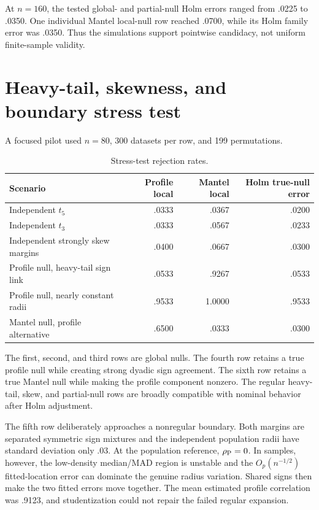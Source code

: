 At $n=160$, the tested global- and partial-null Holm errors ranged from
.0225 to .0350. One individual Mantel local-null row reached .0700, while its
Holm family error was .0350. Thus the simulations support pointwise candidacy,
not uniform finite-sample validity.

\section{Heavy-tail, skewness, and boundary stress test}

A focused pilot used $n=80$, 300 datasets per row, and 199 permutations.

\begin{table}[ht]
\centering
\caption{Stress-test rejection rates.}
\small
\begin{tabular}{lrrr}
\hline
Scenario & Profile local & Mantel local & Holm true-null error\\
\hline
Independent $t_5$ & .0333 & .0367 & .0200\\
Independent $t_3$ & .0333 & .0567 & .0233\\
Independent strongly skew margins & .0400 & .0667 & .0300\\
Profile null, heavy-tail sign link & .0533 & .9267 & .0533\\
Profile null, nearly constant radii & .9533 & 1.0000 & .9533\\
Mantel null, profile alternative & .6500 & .0333 & .0300\\
\hline
\end{tabular}
\end{table}

The first, second, and third rows are global nulls. The fourth row retains a
true profile null while creating strong dyadic sign agreement. The sixth row
retains a true Mantel null while making the profile component nonzero. The
regular heavy-tail, skew, and partial-null rows are broadly compatible with
nominal behavior after Holm adjustment.

The fifth row deliberately approaches a nonregular boundary. Both margins
are separated symmetric sign mixtures and the independent population radii
have standard deviation only .03. At the population reference, $\rho_{\mathrm{P}}=0$.
In samples, however, the low-density median/MAD region is unstable and the
$O_p(n^{-1/2})$ fitted-location error can dominate the genuine radius
variation. Shared signs then make the two fitted errors move together. The
mean estimated profile correlation was .9123, and studentization could not
repair the failed regular expansion.

